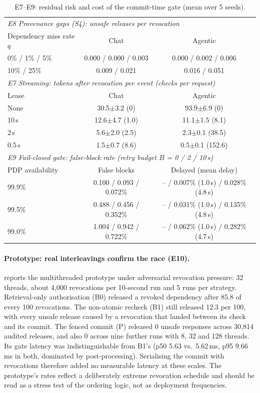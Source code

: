 \documentclass[10pt]{article}
\newcommand{\pmci}[1]{{\scriptsize$\pm$#1}}
\begin{document}
\begin{table}[t]
\centering
\caption{E7--E9: residual risk and cost of the commit-time gate (mean over 5 seeds).}
\label{tab:residual}
\small
\begin{tabular}{lcc}
\toprule
\multicolumn{3}{l}{\emph{E8 Provenance gaps (S4): unsafe releases per revocation}}\\
Dependency miss rate $q$ & Chat & Agentic\\
\midrule
0\% / 1\% / 5\% & 0.000 / 0.000 / 0.003 & 0.000 / 0.002 / 0.006\\
10\% / 25\% & 0.009 / 0.021 & 0.016 / 0.051\\
\midrule
\multicolumn{3}{l}{\emph{E7 Streaming: tokens after revocation per event (checks per request)}}\\
Lease & Chat & Agentic\\
\midrule
None & 30.5\pmci{3.2} (0) & 93.9\pmci{6.9} (0)\\
10\,s & 12.6\pmci{4.7} (1.0) & 11.1\pmci{1.5} (8.1)\\
2\,s & 5.6\pmci{2.0} (2.5) & 2.3\pmci{0.1} (38.5)\\
0.5\,s & 1.5\pmci{0.7} (8.6) & 0.5\pmci{0.1} (152.6)\\
\midrule
\multicolumn{3}{l}{\emph{E9 Fail-closed gate: false-block rate (retry budget $B$ = 0 / 2 / 10\,s)}}\\
PDP availability & False blocks & Delayed (mean delay)\\
\midrule
99.9\% & 0.100 / 0.093 / 0.072\% & -- / 0.007\% (1.0\,s) / 0.028\% (4.8\,s)\\
99.5\% & 0.488 / 0.456 / 0.352\% & -- / 0.031\% (1.0\,s) / 0.135\% (4.8\,s)\\
99.0\% & 1.004 / 0.942 / 0.722\% & -- / 0.062\% (1.0\,s) / 0.282\% (4.7\,s)\\
\bottomrule
\end{tabular}
\end{table}

\paragraph{Prototype: real interleavings confirm the race (E10).}
 reports the multithreaded prototype under adversarial revocation pressure: 32 threads, about 4{,}000 revocations per 10-second run and 5 runs per strategy. Retrieval-only authorisation (B0) released a revoked dependency after 85.8 of every 100 revocations. The non-atomic recheck (B1) still released 12.3 per 100, with every unsafe release caused by a revocation that landed between its check and its commit. The fenced commit (P) released 0 unsafe responses across 30{,}814 audited releases, and also 0 across nine further runs with 8, 32 and 128 threads. Its gate latency was indistinguishable from B1's (p50 5.63 vs.\ 5.62\,ms, p95 9.66\,ms in both, dominated by post-processing). Serialising the commit with revocations therefore added no measurable latency at these scales. The prototype's rates reflect a deliberately extreme revocation schedule and should be read as a stress test of the ordering logic, not as deployment frequencies.
\end{document}
